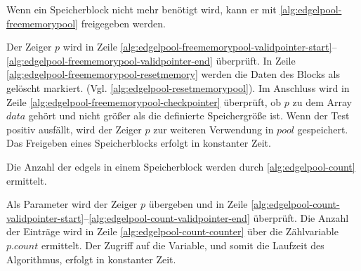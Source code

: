 Wenn ein Speicherblock nicht mehr benötigt wird, kann er mit \autoref{alg:edgelpool-freememorypool} freigegeben werden.

 Der Zeiger $p$ wird in Zeile
 \ref{alg:edgelpool-freememorypool-validpointer-start}--\ref{alg:edgelpool-freememorypool-validpointer-end} überprüft.
 In Zeile \ref{alg:edgelpool-freememorypool-resetmemory} werden die Daten des Blocks als gelöscht markiert.
 (Vgl. \autoref{alg:edgelpool-resetmemorypool}). Im Anschluss wird in Zeile
 \ref{alg:edgelpool-freememorypool-checkpointer} überprüft, ob $p$ zu dem Array $\mathit{data}$ gehört und nicht größer
 als die definierte Speichergröße ist. Wenn der Test positiv ausfällt, wird der Zeiger $p$ zur weiteren Verwendung in
 $\mathit{pool}$ gespeichert. Das Freigeben eines Speicherblocks erfolgt in konstanter Zeit.

Die Anzahl der \glspl{edgel} in einem Speicherblock werden durch \autoref{alg:edgelpool-count} ermittelt.

Als Parameter wird der Zeiger $p$ übergeben und in Zeile
 \ref{alg:edgelpool-count-validpointer-start}--\ref{alg:edgelpool-count-validpointer-end} überprüft. Die Anzahl der
 Einträge wird in Zeile \ref{alg:edgelpool-count-counter} über die Zählvariable $\mathit{p.count}$ ermittelt. Der
 Zugriff auf die Variable, und somit die Laufzeit des Algorithmus, erfolgt in konstanter Zeit.

